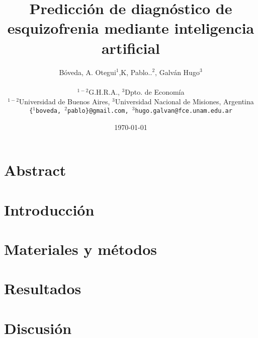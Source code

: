 \documentclass[12pt,a4paper,twoside]{article}
\begin{document}
\title{Predicci\'on de diagn\'ostico de esquizofrenia mediante inteligencia artificial}
\author{
  B\'oveda, A. Otegui$^{1}$,K, Pablo..$^{2}$, Galv\'an Hugo$^{3}$\\ \\
  \small{$^{1-2}$G.H.R.A., $^{3}$Dpto. de Econom\' ia}\\
  \small{$^{1-2}$Universidad de Buenos Aires, $^{3}$Universidad Nacional de Misiones, Argentina}\\
  \small{\texttt{\{$^{1}$boveda, $^{2}$pablo\}@gmail.com, $^{3}$hugo.galvan@fce.unam.edu.ar}}
}
\date{\small{\today}}

\maketitle

\section{Abstract}


\section{Introducci\'on}

\section{Materiales y métodos}

\section{Resultados}
\section{Discusión}


\end{document}
